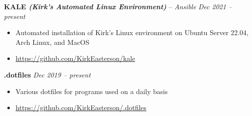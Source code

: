 \documentclass[10pt,letterpaper]{article}
\begin{document}
\spacedhrule{0.3em}{-0.5em}




\headedsection
{\textbf{KALE \textit{(Kirk's Automated Linux Environment)}} -- \textit{Ansible}}
{\textit{Dec 2021 -- present}} {
	\begin{itemize}[noitemsep,nolistsep]
		\item Automated installation of Kirk's Linux environment on Ubuntu Server 22.04, Arch Linux, and MacOS
		\item \url{https://github.com/KirkEasterson/kale}
	\end{itemize}
}


\headedsection
{\textbf{.dotfiles}}
{\textit{Dec 2019 -- present}} {
	\begin{itemize}[noitemsep,nolistsep]
		\item Various dotfiles for programs used on a daily basis
		\item \url{https://github.com/KirkEasterson/.dotfiles}
	\end{itemize}
}

\end{document}
